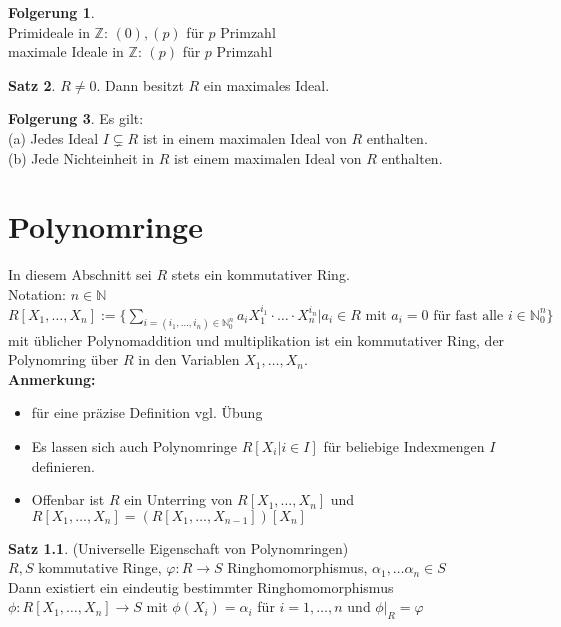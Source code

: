 \documentclass[10pt,a4paper,numbers=endperiod]{scrreprt}
\theoremstyle{definition}
\newtheorem{satz}{Satz}[section]
\newtheorem{folg}[satz]{Folgerung}
\def\NN{{\mathbb N}}
\def\ZZ{{\mathbb Z}}
\begin{document}
\begin{folg}
	$ $\\
	Primideale in $\ZZ$: $(0), (p)$ für $p$ Primzahl\\
	maximale Ideale in $\ZZ$: $(p)$ für $p$ Primzahl
\end{folg}

\begin{satz}
	$R \neq 0$. Dann besitzt $R$ ein maximales Ideal.
\end{satz}

\begin{folg}
	Es gilt:\\
	(a) Jedes Ideal $I \subsetneq R$ ist in einem maximalen Ideal von $R$ enthalten.\\
	(b) Jede Nichteinheit in $R$ ist einem maximalen Ideal von $R$ enthalten.
\end{folg}

\chapter{Polynomringe}

In diesem Abschnitt sei $R$ stets ein kommutativer Ring.\\

Notation: $n \in \NN$\\
$R[X_1, \ldots, X_n] := \{ \sum\limits_{i = (i_1, \ldots, i_n) \in \NN_0^n} a_i X_1^{i_1} \cdot \ldots \cdot X_n^{i_n}| a_i \in R \text{ mit } a_i = 0 \text{ für fast alle } i \in \NN_0^n\}$ mit üblicher Polynomaddition und multiplikation ist ein kommutativer Ring, der Polynomring über $R$ in den Variablen $X_1, \ldots, X_n$.\\

\textbf{Anmerkung:} \begin{itemize}
	\item für eine präzise Definition vgl. Übung
	\item Es lassen sich auch Polynomringe $R[X_i|i \in I]$ für beliebige Indexmengen $I$ definieren.
	\item Offenbar ist $R$ ein Unterring von $R[X_1, \ldots, X_n]$ und $R[X_1, \ldots, X_n] = (R[X_1, \ldots, X_{n-1}])[X_n]$ 
\end{itemize}

\begin{satz}
	(Universelle Eigenschaft von Polynomringen)\\
	$R, S$ kommutative Ringe, $\varphi: R \rightarrow S$ Ringhomomorphismus, $\alpha_1, \ldots \alpha_n \in S$\\
	Dann existiert ein eindeutig bestimmter Ringhomomorphismus\\
	$\phi: R[X_1, \ldots, X_n] \rightarrow S$ mit $\phi(X_i) = \alpha_i$ für $i = 1, \ldots, n$ und $\phi|_R = \varphi$
\end{satz}
\end{document}
